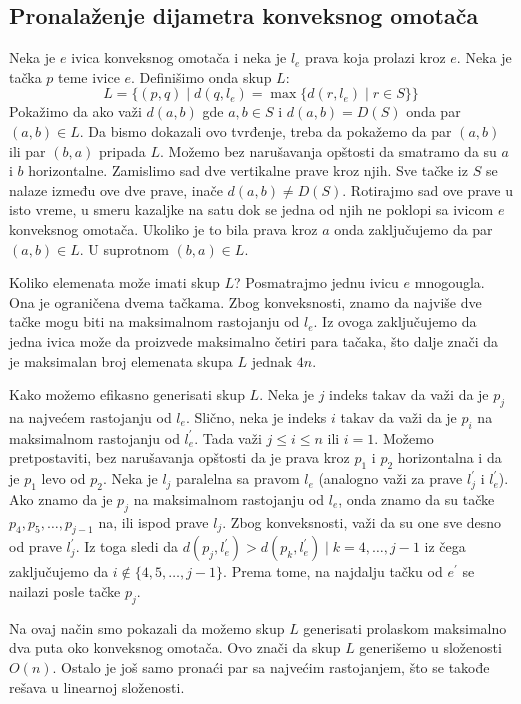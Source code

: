 \documentclass[a4paper]{article}
\begin{document}
\subsection{Pronalaženje dijametra konveksnog omotača}
Neka je \(e\) ivica konveksnog omotača i neka je \(l_{e}\) prava koja prolazi kroz \(e\). Neka je
tačka \(p\) teme ivice \(e\). Definišimo onda skup \(L\):
\[
    L = \{ (p, q) \mid d(q, l_{e}) = \max\{d(r, l_{e}) \mid r \in S\} \}
\]
Pokažimo da ako važi \(d(a, b)\) gde \(a, b \in S\) i \(d(a, b) = D(S)\) onda par \((a, b) \in L\).
Da bismo dokazali ovo tvrđenje, treba da pokažemo da par \((a, b)\) ili par \((b, a)\) pripada \(L\).
Možemo bez narušavanja opštosti da smatramo da su \(a\) i \(b\) horizontalne. Zamislimo sad dve
vertikalne prave kroz njih. Sve tačke iz \(S\) se nalaze između ove dve prave, inače \(d(a, b) \ne D(S)\).
Rotirajmo sad ove prave u isto vreme, u smeru kazaljke na satu dok se jedna od njih ne poklopi sa
ivicom \(e\) konveksnog omotača. Ukoliko je to bila prava kroz \(a\) onda zaključujemo da par
\((a, b) \in L\). U suprotnom \((b, a) \in L\).

Koliko elemenata može imati skup \(L\)? Posmatrajmo jednu ivicu \(e\) mnogougla. Ona je ograničena dvema
tačkama. Zbog konveksnosti, znamo da najviše dve tačke mogu biti na maksimalnom rastojanju od \(l_{e}\).
Iz ovoga zaključujemo da jedna ivica može da proizvede maksimalno četiri para tačaka, što dalje znači
da je maksimalan broj elemenata skupa \(L\) jednak \(4n\).

Kako možemo efikasno generisati skup \(L\). Neka je \(j\) indeks takav da važi da je \(p_{j}\) na najvećem
rastojanju od \(l_{e}\). Slično, neka je indeks \(i\) takav da važi da je \(p_{i}\) na maksimalnom
rastojanju od \(l_{e}^{\prime}\). Tada važi \(j \leq i \leq n\) ili \(i = 1\). Možemo pretpostaviti,
bez narušavanja opštosti da je prava kroz \(p_{1}\) i \(p_{2}\) horizontalna i da je \(p_{1}\) levo od
\(p_{2}\).  Neka je \(l_{j}\) paralelna sa pravom \(l_{e}\) (analogno važi za prave \(l_{j}^{\prime}\) i
\(l_{e}^{\prime}\)). Ako znamo da je \(p_{j}\) na maksimalnom rastojanju od \(l_{e}\), onda znamo da su
tačke \(p_{4}, p_{5},\ldots,p_{j-1}\) na, ili ispod prave \(l_{j}\). Zbog konveksnosti, važi da su one
sve desno od prave \(l_{j}^{\prime}\). Iz toga sledi da \(d(p_{j}, l_{e}^{\prime}) > d(p_{k},
l_{e}^{\prime}) \mid k = 4,\ldots,j-1\) iz čega zaključujemo da \(i \notin \{4,5,\ldots,j-1\}\). Prema
tome, na najdalju tačku od \(e^{\prime}\) se nailazi posle tačke \(p_{j}\).

Na ovaj način smo pokazali da možemo skup \(L\) generisati prolaskom maksimalno dva puta oko konveksnog
omotača. Ovo znači da skup \(L\) generišemo u složenosti \(O(n)\). Ostalo je još samo pronaći par sa
najvećim rastojanjem, što se takođe rešava u linearnoj složenosti.
\end{document}
